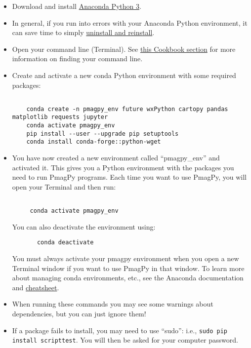 \documentclass[11pt]{article}
\begin{document}
\begin{itemize}
\item Download and install \href{https://www.anaconda.com/download}{Anaconda Python 3}.
  \item In general, if you run into errors with your Anaconda Python environment, it can save time to simply \href{https://docs.anaconda.com/anaconda/install/uninstall/}{uninstall and reinstall}.
   \item Open your command line (Terminal).  See \href{https://earthref.org/PmagPy/cookbook/#command_line}{this Cookbook section} for more information on finding your command line.
   \item Create and activate a new conda Python environment with some required packages: \begin{verbatim}

    conda create -n pmagpy_env future wxPython cartopy pandas matplotlib requests jupyter
    conda activate pmagpy_env
    pip install --user --upgrade pip setuptools
    conda install conda-forge::python-wget
\end{verbatim}
   \item You have now created a new environment called ``pmagpy\_env'' and activated it.  This gives you a Python environment with the packages you need to run PmagPy programs.  Each time you want to use PmagPy, you will open your Terminal and then run:

\begin{verbatim}

     conda activate pmagpy_env
\end{verbatim}
     You can also deactivate the environment using:

     \begin{verbatim}
       conda deactivate
       \end{verbatim}

     You must always activate your pmagpy environment when you open a new Terminal window if you want to use PmagPy in that window.  To learn more about managing conda environments, etc., see the Anaconda documentation and \href{https://know.continuum.io/rs/387-XNW-688/images/conda-cheatsheet.pdf}{cheatsheet}.
   \item When running these commands you may see some warnings about dependencies, but you can just ignore them!

\item If a package fails to install, you may need to use ``sudo'': i.e., \texttt{sudo pip install scripttest}.  You will then be asked for your computer password.

  \end{itemize}
\end{document}
